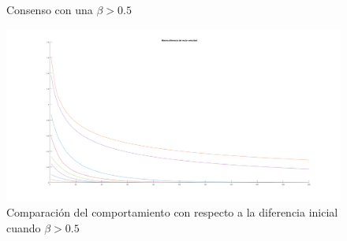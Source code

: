 \begin{figure}[htbp]
\centering
\caption{Consenso con una $\beta > 0.5$} 
\label{fig:CS075_consenso}
\end{figure}

\begin{figure}[!ht]
    \centering
    \includegraphics[width=\textwidth]{fig/cap04/2CSB075/consenso/todas.png}
    \caption{Comparación del comportamiento con respecto a la diferencia inicial cuando $\beta > 0.5$}
    \label{fig:CS075_comparacion_consenso}
\end{figure}

